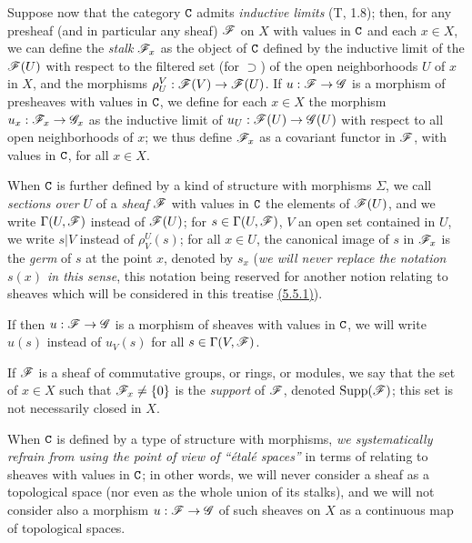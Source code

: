 \begin{env}[3.1.6]
\label{env-0.3.1.6}
Suppose now that the category $\mathtt{C}$ admits {\em inductive limits} (T, 1.8);
then, for any presheaf (and in particular any sheaf) $\mathscr{F}$ on $X$ with values
in $\mathtt{C}$ and each $x\in X$, we can define the {\em stalk} $\mathscr{F}_x$ as the
object of $\mathtt{C}$ defined by the inductive limit of the $\mathscr{F}(U)$ with respect to
the filtered set (for $\supset$) of the open neighborhoods $U$ of $x$ in $X$,
and the morphisms $\rho_U^V:\mathscr{F}(V)\to\mathscr{F}(U)$. If $u:\mathscr{F}\to\mathscr{G}$ is a
morphism of presheaves with values in $\mathtt{C}$, we define for each $x\in X$ the
morphism $u_x:\mathscr{F}_x\to\mathscr{G}_x$ as the inductive limit of
$u_U:\mathscr{F}(U)\to\mathscr{G}(U)$ with respect to all open neighborhoods of $x$; we
thus define $\mathscr{F}_x$ as a covariant functor in $\mathscr{F}$, with values in $\mathtt{C}$,
for all $x\in X$.

When $\mathtt{C}$ is further defined by a kind of structure with morphisms $\Sigma$, we
call {\em sections over $U$} of a {\em sheaf} $\mathscr{F}$ with values in $\mathtt{C}$ the
elements of $\mathscr{F}(U)$, and we write $\Gamma(U,\mathscr{F})$ instead of $\mathscr{F}(U)$;
for $s\in\Gamma(U,\mathscr{F})$, $V$ an open set contained in $U$, we write $s|V$
instead of $\rho_V^U(s)$; for all $x\in U$, the canonical image of $s$ in
$\mathscr{F}_x$ is the {\em germ} of $s$ at the point $x$, denoted by $s_x$
({\em we will never replace the notation $s(x)$ in this sense}, this notation
being reserved for another notion relating to sheaves which will be considered
in this treatise \hyperref[env-0.5.5.1]{(5.5.1)}).

If then $u:\mathscr{F}\to\mathscr{G}$ is a morphism of sheaves with values in $\mathtt{C}$, we
will write $u(s)$ instead of $u_V(s)$ for all $s\in\Gamma(V,\mathscr{F})$.

If $\mathscr{F}$ is a sheaf of commutative groups, or rings, or modules, we say that
the set of $x\in X$ such that $\mathscr{F}_x\neq\{0\}$ is the {\em support} of
$\mathscr{F}$, denoted ${\mathop{\mathrm{Supp}}\nolimits}(\mathscr{F})$; this set is not necessarily closed in $X$.

When $\mathtt{C}$ is defined by a type of structure with morphisms, {\em we
systematically refrain from using the point of view of ``\'etal\'e spaces''} in
terms of relating to sheaves with values in $\mathtt{C}$; in other words, we will never
consider a sheaf as a topological space (nor even as the whole union of its
stalks), and we will not consider also a morphism $u:\mathscr{F}\to\mathscr{G}$ of such
sheaves on $X$ as a continuous map of topological spaces.
\end{env}

